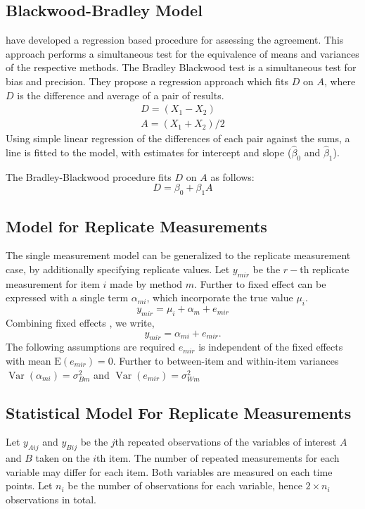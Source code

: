 \documentclass[12pt, a4paper]{report}
\theoremstyle{plain}
\theoremstyle{definition}
\theoremstyle{remark}
\begin{document}
\subsection{Blackwood-Bradley Model} 



\citet{BB89} have developed a regression based procedure for
assessing the agreement. This approach performs a simultaneous test for the equivalence of
means and variances of the respective methods. The Bradley Blackwood test is a simultaneous test for bias and
precision. They propose a regression approach which fits $D$ on $A$, where $D$ is the difference and average of a pair of results. 
\begin{eqnarray}
D = (X_{1}-X_{2}) \\
A = (X_{1} + X_{2}) /2
\end{eqnarray}
Using simple linear regression of the differences of each pair against the sums, a line is fitted to the model, with estimates for intercept and slope ($\hat{\beta}_{0}$ and $\hat{\beta}_{1}$).

The Bradley-Blackwood procedure fits $D$ on $A$ as follows:
\begin{equation}
D = \beta_{0} + \beta_{1}A
\end{equation}




\subsection{Model for Replicate Measurements}

The single measurement model can be generalized to the replicate measurement case, by additionally specifying replicate values. Let $y_{mir}$ be the $r-$th replicate measurement for item $i$ made by method $m$. Further to \citet{barnhart} fixed effect can be expressed with a single term $\alpha_{mi}$, which incorporate the true value $\mu_i$.
\[ y_{mir} = \mu_{i} + \alpha_{m} + e_{mir}  \]
Combining fixed effects \citep{barnhart}, we write,
\[ y_{mir} = \alpha_{mi} + e_{mir}.\]
The following assumptions are required
$e_{mir}$ is independent of the fixed effects with mean $\mbox{E}(e_{mir}) = 0$.
Further to \citet{barnhart} between-item and within-item variances $\operatorname{Var}(\alpha_{mi}) = \sigma^2_{Bm}$ and $\operatorname{Var}(e_{mir}) = \sigma^2_{Wm}$		

\subsection{Statistical Model For Replicate Measurements}
Let $y_{Aij}$ and $y_{Bij}$ be the $j$th repeated observations of the variables of interest $A$ and $B$ taken on the $i$th item. The number of repeated measurements for each variable may differ for each item.
Both variables are measured on each time points. Let $n_{i}$ be the number of observations for each variable, hence $2\times n_{i}$ observations in total.
\end{document}
